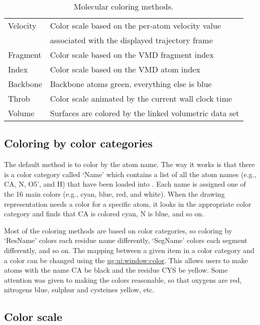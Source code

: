 \begin{table}[htb]
\begin{tabular}{|l|l|}
    Velocity    & Color scale based on the per-atom velocity value \\
                & associated with the displayed trajectory frame \\
    Fragment    & Color scale based on the VMD fragment index \\
    Index	& Color scale based on the VMD atom index \\
    Backbone	& Backbone atoms green, everything else is blue \\ 
    Throb	& Color scale animated by the current wall clock time \\ 
    Volume      & Surfaces are colored by the linked volumetric data set \\
  \hline
  \end{tabular}
  \caption{Molecular coloring methods.}
  \label{table:ug:colormethods}
\end{table}


\subsection{Coloring by color categories}
\label{ug:topic:coloring:categories}

The default method is to color by the atom name.  The way it works is
that there is a color category called `Name' which contains a list of
all the atom names (e.g., CA, N, O5', and H) that have been loaded into
\VMD.  Each name is assigned one of the 16 main colors (e.g., cyan, blue, red,
and white).  When the drawing representation needs a color for a
specific atom, it looks in the appropriate color category and finds
that CA is colored cyan, N is blue, and so on.

Most of the coloring methods are based on color categories, so
coloring by `ResName' colors each residue name differently, `SegName'
colors each segment differently, and so on.  The mapping between a
given item in a color category and a color can be changed using the
\hyperref{{\sf Color} window}{{\sf Color} window [\S}{]}{ug:ui:window:color}.
This allows users to make atoms with the name CA be black and the
residue CYS be yellow.  Some attention was given to making the colors
reasonable, so that oxygens are red, nitrogens blue, sulphur and
cysteines yellow, etc.

\subsection{Color scale}
\label{ug:topic:coloring:scale}

